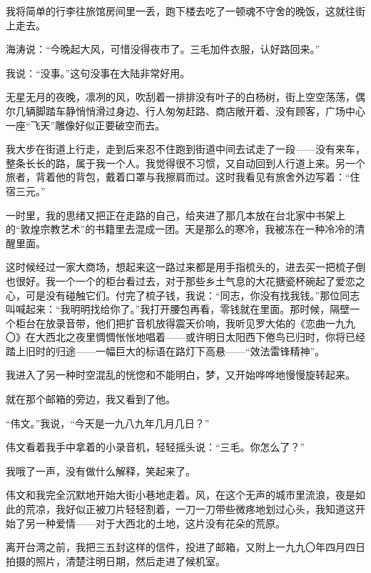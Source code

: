 \par 我将简单的行李往旅馆房间里一丢，跑下楼去吃了一顿魂不守舍的晚饭，这就往街上走去。
\par 海涛说：“今晚起大风，可惜没得夜市了。三毛加件衣服，认好路回来。”
\par 我说：“没事。”这句没事在大陆非常好用。
\par 无星无月的夜晚，凛冽的风，吹刮着一排排没有叶子的白杨树，街上空空荡荡，偶尔几辆脚踏车静悄悄滑过身边、行人匆匆赶路、商店敞开着、没有顾客，广场中心一座“飞天”雕像好似正要破空而去。
\par 我大步在街道上行走，走到后来忍不住跑到街道中间去试走了一段——没有来车，整条长长的路，属于我一个人。我觉得很不习惯，又自动回到人行道上来。另一个旅者，背着他的背包，戴着口罩与我擦肩而过。这时我看见有旅舍外边写着：“住宿三元。”
\par 一时里，我的思绪又把正在走路的自己，给夹进了那几本放在台北家中书架上的“敦煌宗教艺术”的书籍里去混成一团。天是那么的寒冷，我被冻在一种冷冷的清醒里面。
\par 这时候经过一家大商场，想起来这一路过来都是用手指梳头的，进去买一把梳子倒也很好。我一个一个的柜台看过去，对于那些乡土气息的大花搪瓷杯碗起了爱恋之心，可是没有碰触它们。付完了梳子钱，我说：“同志，你没有找我钱。”那位同志叫喊起来：“我明明找给你了。”我打开腰包再看，零钱就在里面。那时候，隔壁一个柜台在放录音带，他们把扩音机放得震天价响，我听见罗大佑的《恋曲一九九〇》在大西北之夜里惆惆怅怅地唱着——或许明日太阳西下倦鸟已归时，你将已经踏上旧时的归途——一幅巨大的标语在路灯下高悬——“效法雷锋精神”。
\par 我进入了另一种时空混乱的恍惚和不能明白，梦，又开始哗哗地慢慢旋转起来。
\par 就在那个邮箱的旁边，我又看到了他。
\par “伟文。”我说，“今天是一九八九年几月几日？”
\par 伟文看着我手中拿着的小录音机，轻轻摇头说：“三毛。你怎么了？”
\par 我哦了一声，没有做什么解释，笑起来了。
\par 伟文和我完全沉默地开始大街小巷地走着。风，在这个无声的城市里流浪，夜是如此的荒凉，我好似正被刀片轻轻割着，一刀一刀带些微疼地划过心头，我知道这开始了另一种爱情——对于大西北的土地，这片没有花朵的荒原。
\par 离开台湾之前，我把三五封这样的信件，投进了邮箱，又附上一九九〇年四月四日拍摄的照片，清楚注明日期，然后走进了候机室。

